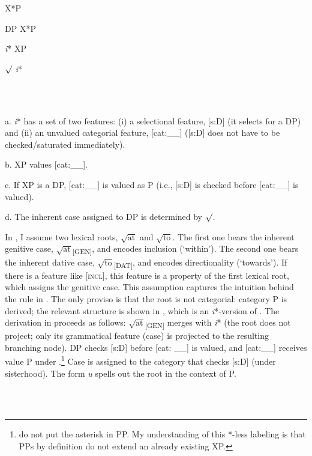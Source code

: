 \documentclass[output=paper,colorlinks,citecolor=brown]{./langscibook}
\begin{document}
          X*P

  DP  X*P

  \textit{i}*  XP

   ${\surd}$   \textit{i}*

\ea%
    \label{ex:tsedryk:16}
    \gll\\
        \\
    \glt
    \z

          a.  \textit{i}* has a set of two features: (i) a selectional feature, [s:D] (it selects for a DP) and (ii) an unvalued categorial feature, [cat:\_\_] ([s:D] does not have to be checked/saturated immediately). 

  b.  XP values [cat:\_\_]. 

  c.  If XP is a DP, [cat:\_\_] is valued as P (i.e., [s:D] is checked before [cat:\_\_] is valued).

  d.  The inherent case assigned to DP is determined by  ${\surd}$.

In \citet{TsedrykInPress}, I assume two lexical roots,  $\sqrt{\text{at}}$  and  $\sqrt{\text{to}}$. The first one bears the inherent genitive case,  $\sqrt{\text{at}}$\textsubscript{[GEN]}, and encodes inclusion (‘within’). The second one bears the inherent dative case,  $\sqrt{\text{to}}$\textsubscript{[DAT]}, and encodes directionality (‘towards’). If there is a feature like [\textsc{incl}], this feature is a property of the first lexical root, which assigns the genitive case. This assumption captures the intuition behind the rule in . The only proviso is that the root is not categorial: category P is derived; the relevant structure is shown in , which is an \textit{i}*-version of . The derivation in  proceeds as follows:  $\sqrt{\text{at}}$\textsubscript{[GEN]} merges with \textit{i}* (the root does not project; only its grammatical feature (case) is projected to the resulting branching node). DP checks [s:D] before [cat: \_\_] is valued, and [cat:\_\_] receives value P under .\footnote{\citet{WoodMarantz2017} do not put the asterisk in PP. My understanding of this *-less labeling is that PPs by definition do not extend an already existing XP.}  Case is assigned to the category that checks [s:D] (under sisterhood). The form \textit{u} spells out the root in the context of P.

\ea%
    \label{ex:tsedryk:17}
    \gll\\
        \\
    \glt
    \z
\end{document}
